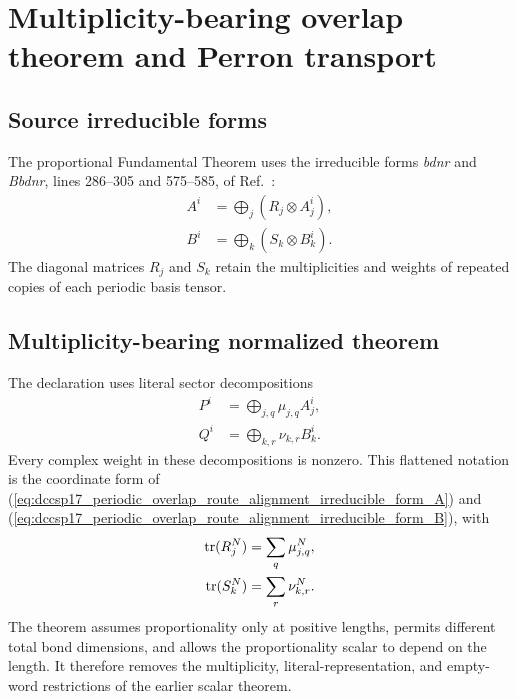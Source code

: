 \documentclass{article}
\begin{document}
\section{Multiplicity-bearing overlap theorem and Perron transport}

\subsection{Source irreducible forms}

The proportional Fundamental Theorem uses the irreducible forms
\emph{bdnr} and \emph{Bbdnr}, lines 286--305 and 575--585, of
Ref.~\cite{DeLasCuevas2017Irreducible}:
\begin{align}
    A^i
    &=\bigoplus_j(R_j\otimes A_j^i),
    \label{eq:dccsp17_periodic_overlap_route_alignment_irreducible_form_A}\\
    B^i
    &=\bigoplus_k(S_k\otimes B_k^i).
    \label{eq:dccsp17_periodic_overlap_route_alignment_irreducible_form_B}
\end{align}
The diagonal matrices $R_j$ and $S_k$ retain the multiplicities and weights of
repeated copies of each periodic basis tensor.

\subsection{Multiplicity-bearing normalized theorem}

The declaration
 uses literal sector
decompositions
\begin{align}
    P^i
    &=\bigoplus_{j,q}\mu_{j,q}A_j^i,
    \label{eq:dccsp17_periodic_overlap_route_alignment_literal_decomposition_P}\\
    Q^i
    &=\bigoplus_{k,r}\nu_{k,r}B_k^i.
    \label{eq:dccsp17_periodic_overlap_route_alignment_literal_decomposition_Q}
\end{align}
Every complex weight in these decompositions is nonzero. This flattened
notation is the coordinate form of
(\ref{eq:dccsp17_periodic_overlap_route_alignment_irreducible_form_A}) and
(\ref{eq:dccsp17_periodic_overlap_route_alignment_irreducible_form_B}), with
\begin{align}
    \operatorname{tr}(R_j^N)
    &=\sum_q\mu_{j,q}^N,
    \label{eq:dccsp17_periodic_overlap_route_alignment_R_power_sum}\\
    \operatorname{tr}(S_k^N)
    &=\sum_r\nu_{k,r}^N.
    \label{eq:dccsp17_periodic_overlap_route_alignment_S_power_sum}
\end{align}
The theorem assumes proportionality only at positive lengths, permits
different total bond dimensions, and allows the proportionality scalar to
depend on the length. It therefore removes the multiplicity,
literal-representation, and empty-word restrictions of the earlier scalar
theorem.
\end{document}
